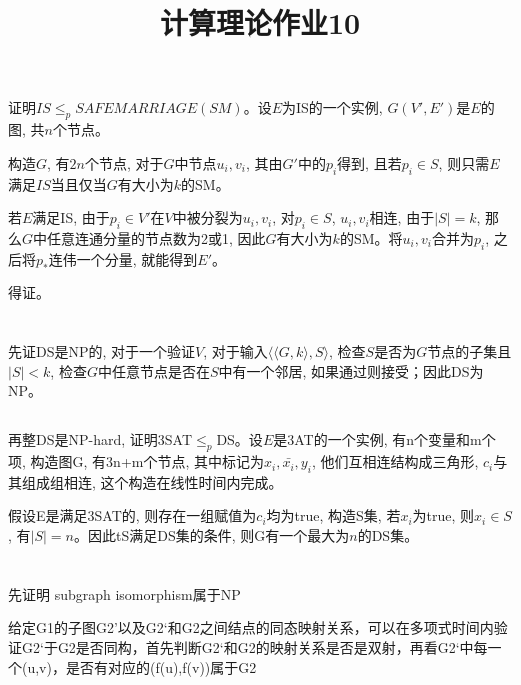 \documentclass{zpt}
\title{计算理论作业10}
\begin{document}
\maketitle
\newcommand{\rd}{\le_p}
\section{}
证明$IS\rd SAFEMARRIAGE(SM)$。设$E$为IS的一个实例, $G(V',E')$是$E$的图, 共$n$个节点。

构造$G$, 有$2n$个节点, 对于$G$中节点$u_i,v_i$, 其由$G'$中的$p_i$得到, 且若$p_i\in S$, 则只需$E$满足$IS$当且仅当$G$有大小为$k$的SM。

若$E$满足IS, 由于$p_i\in V'$在$V$中被分裂为$u_i,v_i$, 对$p_i\in S$, $u_i,v_i$相连, 由于$|S| = k$, 那么$G$中任意连通分量的节点数为2或1, 因此$G$有大小为$k$的SM。将$u_i,v_i$合并为$p_i$, 之后将$p_*$连伟一个分量, 就能得到$E'$。

得证。

\section{}
\subsection{}
先证DS是NP的, 对于一个验证$V$, 对于输入$\langle\langle G,k\rangle,S\rangle$, 检查$S$是否为$G$节点的子集且$|S|<k$, 检查$G$中任意节点是否在$S$中有一个邻居, 如果通过则接受；因此DS为NP。
\subsection{}
再整DS是NP-hard, 证明3SAT$\rd$DS。设$E$是3AT的一个实例, 有n个变量和m个项, 构造图G, 有3n+m个节点, 其中标记为$x_i,\bar{x_i},y_i$, 他们互相连结构成三角形, $c_i$与其组成组相连, 这个构造在线性时间内完成。

假设E是满足3SAT的, 则存在一组赋值为$c_i$均为true, 构造S集, 若$x_i$为true, 则$x_i\in S$, 有$|S|=n$。因此tS满足DS集的条件, 则G有一个最大为$n$的DS集。

\section{}
\subsection{}
先证明 subgraph isomorphism属于NP

给定G1的子图G2'以及G2‘和G2之间结点的同态映射关系，可以在多项式时间内验证G2‘于G2是否同构，首先判断G2‘和G2的映射关系是否是双射，再看G2‘中每一个(u,v)，是否有对应的(f(u),f(v))属于G2
\end{document}

